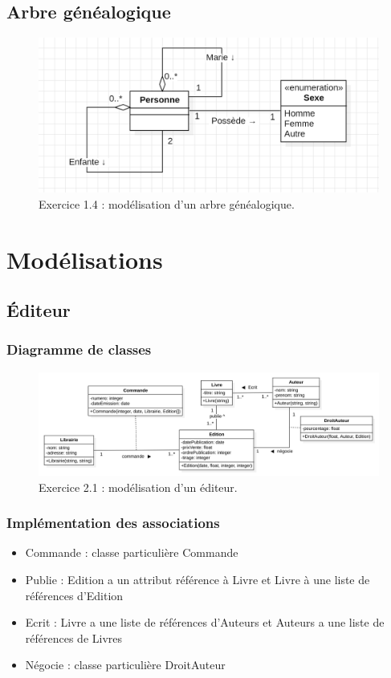 \documentclass{article}
\begin{document}
\pagebreak
\subsection{Arbre généalogique}
\begin{figure}[!htb]
    \centering
    \includegraphics[width=0.5\textheight]{./images/1-5_genealogie.png}
    \caption{Exercice 1.4 : modélisation d'un arbre généalogique.}
\end{figure}

\pagebreak
\section{Modélisations}
\subsection{Éditeur}
\subsubsection{Diagramme de classes}
\begin{figure}[!htb]
    \centering
    \includegraphics[width=1\textwidth]{./images/2-1_editeur.png}
    \caption{Exercice 2.1 : modélisation d'un éditeur.}
\end{figure}

\subsubsection{Implémentation des associations}
\begin{itemize}
\item Commande : classe particulière Commande
\item Publie : Edition a un attribut référence à Livre et Livre à une liste de références d'Edition
\item Ecrit : Livre a une liste de références d'Auteurs et Auteurs a une liste de références de Livres
\item Négocie : classe particulière DroitAuteur
\end{itemize}
\end{document}
